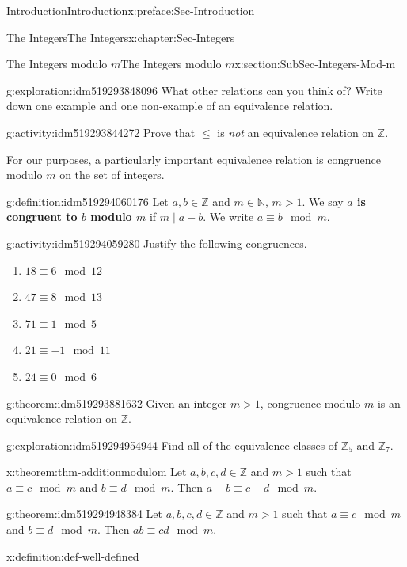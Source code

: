\documentclass[oneside,10pt,]{book}
\newcommand{\terminology}[1]{\textbf{#1}}
\numberwithin{equation}{section}
\renewcommand{\le}{\leqslant}
\def\Z{{\mathbb Z}}
\def\N{{\mathbb N}}
\begin{document}
\begin{preface}{Introduction}{}{Introduction}{}{}{x:preface:Sec-Introduction}
\begin{chapterptx}{The Integers}{}{The Integers}{}{}{x:chapter:Sec-Integers}
\begin{sectionptx}{The Integers modulo \(m\)}{}{The Integers modulo \(m\)}{}{}{x:section:SubSec-Integers-Mod-m}
\begin{exploration}{}{g:exploration:idm519293848096}
What other relations can you think of? Write down one example and one non-example of an equivalence relation.%
\end{exploration}
\begin{activity}{}{g:activity:idm519293844272}%
Prove that \(\le\) is \emph{not} an equivalence relation on \(\Z\).%
\end{activity}
For our purposes, a particularly important equivalence relation is congruence modulo \(m\) on the set of integers.%
\begin{definition}{}{g:definition:idm519294060176}%
%
Let \(a,b\in \Z\) and \(m \in \N\), \(m > 1\). We say \terminology{\(a\) is congruent to \(b\) modulo \(m\)} if \(m\mid a-b\). We write \(a \equiv b\mod m\).%
\end{definition}
\begin{activity}{}{g:activity:idm519294059280}%
Justify the following congruences.%
\begin{enumerate}
\item{}\(\displaystyle 18 \equiv 6\mod 12\)%
\item{}\(\displaystyle 47 \equiv 8\mod 13\)%
\item{}\(\displaystyle 71 \equiv 1\mod 5\)%
\item{}\(\displaystyle 21 \equiv -1 \mod 11\)%
\item{}\(\displaystyle 24 \equiv 0\mod 6\)%
\end{enumerate}
%
\end{activity}
\begin{theorem}{}{}{g:theorem:idm519293881632}%
Given an integer \(m > 1\), congruence modulo \(m\) is an equivalence relation on \(\Z\).%
\end{theorem}
\label{g:notation:idm519294956864}%
\begin{exploration}{}{g:exploration:idm519294954944}%
Find all of the equivalence classes of \(\Z_5\) and \(\Z_7\).%
\end{exploration}
\begin{theorem}{}{}{x:theorem:thm-additionmodulom}%
Let \(a,b, c,d\in \Z\) and \(m > 1\) such that \(a\equiv c\mod m\) and \(b\equiv d\mod m\). Then \(a+b \equiv c + d \mod m\).%
\end{theorem}
\begin{theorem}{}{}{g:theorem:idm519294948384}%
Let \(a,b, c,d\in \Z\) and \(m > 1\) such that \(a\equiv c\mod m\) and \(b\equiv d\mod m\). Then \(ab \equiv c d\mod m\).%
\end{theorem}
\begin{definition}{}{x:definition:def-well-defined}%

\end{definition}
\end{sectionptx}
\end{chapterptx}
\end{preface}
\end{document}
